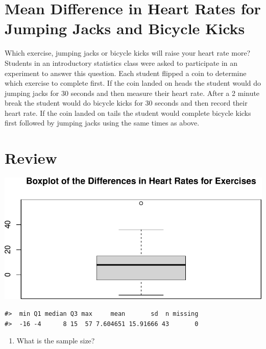 \documentclass[
]{report}
\providecommand{\tightlist}{%
  \setlength{\itemsep}{0pt}\setlength{\parskip}{0pt}}
\begin{document}
\hypertarget{mean-difference-in-heart-rates-for-jumping-jacks-and-bicycle-kicks}{%
\section{Mean Difference in Heart Rates for Jumping Jacks and Bicycle Kicks}\label{mean-difference-in-heart-rates-for-jumping-jacks-and-bicycle-kicks}}

Which exercise, jumping jacks or bicycle kicks will raise your heart rate more? Students in an introductory statistics class were asked to participate in an experiment to answer this question. Each student flipped a coin to determine which exercise to complete first. If the coin landed on heads the student would do jumping jacks for 30 seconds and then measure their heart rate. After a 2 minute break the student would do bicycle kicks for 30 seconds and then record their heart rate. If the coin landed on tails the student would complete bicycle kicks first followed by jumping jacks using the same times as above.

\hypertarget{review}{%
\section{Review}\label{review}}

\begin{center}\includegraphics[width=0.7\linewidth]{08-paired_files/figure-latex/unnamed-chunk-1-1} \end{center}

\begin{verbatim}
#>  min Q1 median Q3 max     mean       sd  n missing
#>  -16 -4      8 15  57 7.604651 15.91666 43       0
\end{verbatim}

\begin{enumerate}
\def\labelenumi{\arabic{enumi}.}
\tightlist
\item
  What is the sample size?
\end{enumerate}

\vspace{0.5in}
\end{document}
